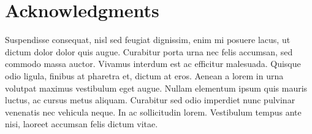 \copyrightpage

\signaturepage

\restoregeometry


\begin{abstractpage}

\end{abstractpage}

\cleardoublepage


\chapter*{Acknowledgments}
Suspendisse consequat, nisl sed feugiat dignissim, enim mi posuere lacus, ut dictum dolor dolor quis augue. Curabitur porta urna nec felis accumsan, sed commodo massa auctor. Vivamus interdum est ac efficitur malesuada. Quisque odio ligula, finibus at pharetra et, dictum at eros. Aenean a lorem in urna volutpat maximus vestibulum eget augue. Nullam elementum ipsum quis mauris luctus, ac cursus metus aliquam. Curabitur sed odio imperdiet nunc pulvinar venenatis nec vehicula neque. In ac sollicitudin lorem. Vestibulum tempus ante nisi, laoreet accumsan felis dictum vitae.

